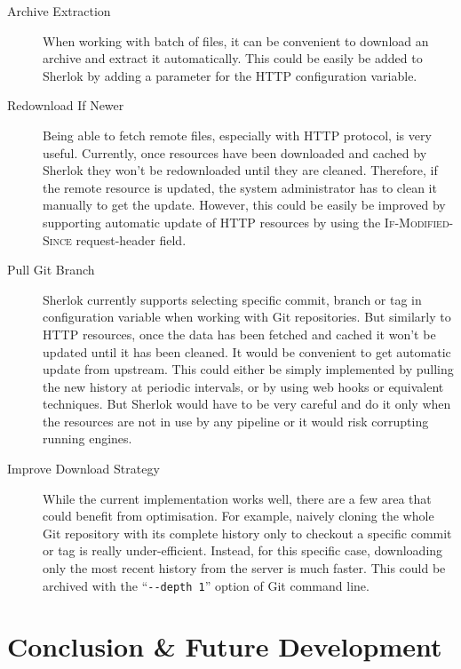 \documentclass{article}
\newcommand{\ID}[1]{{\textsc{#1}}}
\begin{document}
\begin{description}

    \item[Archive Extraction] When working with batch of files, it can be convenient to download an
        archive and extract it automatically. This could be easily be added to Sherlok by adding a
        parameter for the HTTP configuration variable.

    \item[Redownload If Newer] Being able to fetch remote files, especially with HTTP protocol, is
        very useful. Currently, once resources have been downloaded and cached by Sherlok they won't
        be redownloaded until they are cleaned. Therefore, if the remote resource is updated, the
        system administrator has to clean it manually to get the update. However, this could be
        easily be improved by supporting automatic update of HTTP resources by using the
        \ID{If-Modified-Since} request-header field.

    \item[Pull Git Branch] Sherlok currently supports selecting specific commit, branch or tag in
        configuration variable when working with Git repositories. But similarly to HTTP resources,
        once the data has been fetched and cached it won't be updated until it has been cleaned. It
        would be convenient to get automatic update from upstream. This could either be simply
        implemented by pulling the new history at periodic intervals, or by using web hooks or
        equivalent techniques. But Sherlok would have to be very careful and do it only when the
        resources are not in use by any pipeline or it would risk corrupting running engines.

    \item[Improve Download Strategy] While the current implementation works well, there are a few
        area that could benefit from optimisation. For example, naively cloning the whole Git
        repository with its complete history only to checkout a specific commit or tag is really
        under-efficient. Instead, for this specific case, downloading only the most recent history
        from the server is much faster. This could be archived with the ``\verb#--depth 1#'' option
        of Git command line.

\end{description}

\section{Conclusion \& Future Development}
\label{sec:conclusion}
\end{document}
